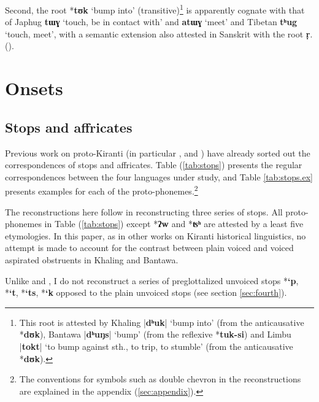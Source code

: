 \documentclass[oneside,a4paper,11pt]{article}
\newcommand{\ipa}[1]{\textbf{{\phon\mbox{#1}}}} %
\newcommand{\dhatu}[2]{|\ipa{#1}| `#2'}
\begin{document}
Second,  the root *\ipa{tʊk} `bump into' (transitive)\footnote{This root is attested by Khaling \dhatu{dʰuk}{bump into} (from the anticausative  *\ipa{dʊk}), Bantawa  \dhatu{dʰuŋs}{bump} (from the reflexive *\ipa{tuk-si}) and Limbu \dhatu{tokt}{to bump against sth., to trip, to stumble}  (from the anticausative  *\ipa{dʊk}).} is apparently cognate with that of Japhug \ipa{tɯɣ} `touch, be in contact with' and \ipa{atɯɣ} `meet' and Tibetan \ipa{tʰug} `touch, meet', with a semantic extension also attested in Sanskrit with the root \ipa{ṛ}.
(\citealt[3]{pooth15eri}).

\section{Onsets} \label{sec:onsets}

\subsection{Stops and affricates} \label{sec:stops}

Previous work on proto-Kiranti (in particular \citealt{starostin94kiranti}, \citealt{michailovsky94stops} and \citealt{opgenort05jero}) have already sorted out the correspondences of stops and affricates. Table (\ref{tab:stops}) presents the regular correspondences between the four languages under study, and Table \ref{tab:stops.ex} presents examples for each of the proto-phonemes.\footnote{The conventions for symbols such as double chevron in the reconstructions are explained in the appendix (\ref{sec:appendix}).}


The reconstructions here follow \citet{michailovsky94stops} in reconstructing three series of stops.  All proto-phonemes in Table (\ref{tab:stops}) except *\ipa{ʔw} and *\ipa{ʦʰ} are attested by a least five etymologies. In this paper, as in other works on Kiranti historical linguistics, no attempt is made to account for the contrast between plain voiced and voiced aspirated obstruents in Khaling and Bantawa.

Unlike \citet{starostin94kiranti} and \citet{opgenort05jero}, I do not reconstruct a series of preglottalized unvoiced stops *\ipa{`p},  *\ipa{`t},  *\ipa{`ts},  *\ipa{`k} opposed to the plain unvoiced stops (see section \ref{sec:fourth}). 
\end{document}
